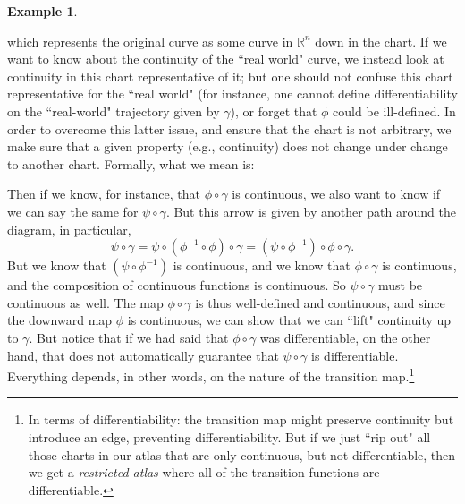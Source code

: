 \documentclass[11pt]{book}
\theoremstyle{definition}
\newtheorem{example}{Example}[section]
\theoremstyle{definition}
\theoremstyle{definition}
\theoremstyle{theorem}
\theoremstyle{definition}
\begin{document}
\begin{example}
\begin{center}
	\end{center}  
	which represents the original curve as some curve in $\mathbb{R}^n$ down in the chart. If we want to know about the continuity of the ``real world" curve, we instead look at continuity in this chart representative of it; but one should not confuse this chart representative for the ``real world" (for instance, one cannot define differentiability on the ``real-world" trajectory given by $\gamma$), or forget that $\phi$ could be ill-defined. In order to overcome this latter issue, and ensure that the chart is not arbitrary, we make sure that a given property (e.g., continuity) does not change under change to another chart. Formally, what we mean is: 
	\begin{center} 
	\end{center} 
	Then if we know, for instance, that $\phi \circ \gamma$ is continuous, we also want to know if we can say the same for $\psi \circ \gamma$. But this arrow is given by another path around the diagram, in particular,
	\begin{equation*}
	\psi \circ \gamma = \psi \circ (\phi^{-1} \circ \phi) \circ \gamma = (\psi \circ \phi^{-1}) \circ \phi \circ \gamma. 
	\end{equation*}
	But we know that $(\psi \circ \phi^{-1})$ is continuous, and we know that $\phi \circ \gamma$ is continuous, and the composition of continuous functions is continuous. So $\psi \circ \gamma$ must be continuous as well. The map $\phi \circ \gamma$ is thus well-defined and continuous, and since the downward map $\phi$ is continuous, we can show that we can ``lift" continuity up to $\gamma$. But notice that if we had said that $\phi \circ \gamma$ was differentiable, on the other hand, that does not automatically guarantee that $\psi \circ \gamma$ is differentiable. Everything depends, in other words, on the nature of the transition map.\footnote{In terms of differentiability: the transition map might preserve continuity but introduce an edge, preventing differentiability. But if we just ``rip out" all those charts in our atlas that are only continuous, but not differentiable, then we get a \textit{restricted atlas} where all of the transition functions are differentiable.}\par 

\end{example}
\end{document}
